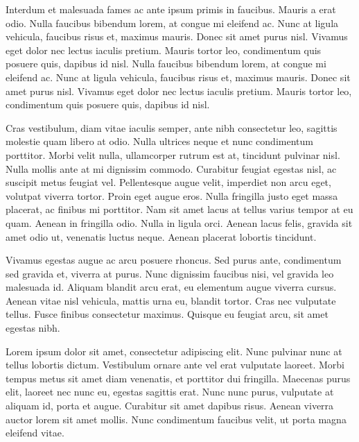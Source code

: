 \initial Interdum et malesuada fames ac ante ipsum primis in faucibus. Mauris a erat odio. Nulla faucibus bibendum lorem, at congue mi eleifend ac. Nunc at ligula vehicula, faucibus risus et, maximus mauris. Donec sit amet purus nisl. Vivamus eget dolor nec lectus iaculis pretium. Mauris tortor leo, condimentum quis posuere quis, dapibus id nisl. Nulla faucibus bibendum lorem, at congue mi eleifend ac. Nunc at ligula vehicula, faucibus risus et, maximus mauris. Donec sit amet purus nisl. Vivamus eget dolor nec lectus iaculis pretium. Mauris tortor leo, condimentum quis posuere quis, dapibus id nisl.

\initial Cras vestibulum, diam vitae iaculis semper, ante nibh consectetur leo, sagittis molestie quam libero at odio. Nulla ultrices neque et nunc condimentum porttitor. Morbi velit nulla, ullamcorper rutrum est at, tincidunt pulvinar nisl. Nulla mollis ante at mi dignissim commodo. Curabitur feugiat egestas nisl, ac suscipit metus feugiat vel. Pellentesque augue velit, imperdiet non arcu eget, volutpat viverra tortor. Proin eget augue eros. Nulla fringilla justo eget massa placerat, ac finibus mi porttitor. Nam sit amet lacus at tellus varius tempor at eu quam. Aenean in fringilla odio. Nulla in ligula orci. Aenean lacus felis, gravida sit amet odio ut, venenatis luctus neque. Aenean placerat lobortis tincidunt.

\initial Vivamus egestas augue ac arcu posuere rhoncus. Sed purus ante, condimentum sed gravida et, viverra at purus. Nunc dignissim faucibus nisi, vel gravida leo malesuada id. Aliquam blandit arcu erat, eu elementum augue viverra cursus. Aenean vitae nisl vehicula, mattis urna eu, blandit tortor. Cras nec vulputate tellus. Fusce finibus consectetur maximus. Quisque eu feugiat arcu, sit amet egestas nibh.

\initial Lorem ipsum dolor sit amet, consectetur adipiscing elit. Nunc pulvinar nunc at tellus lobortis dictum. Vestibulum ornare ante vel erat vulputate laoreet. Morbi tempus metus sit amet diam venenatis, et porttitor dui fringilla. Maecenas purus elit, laoreet nec nunc eu, egestas sagittis erat. Nunc nunc purus, vulputate at aliquam id, porta et augue. Curabitur sit amet dapibus risus. Aenean viverra auctor lorem sit amet mollis. Nunc condimentum faucibus velit, ut porta magna eleifend vitae.

